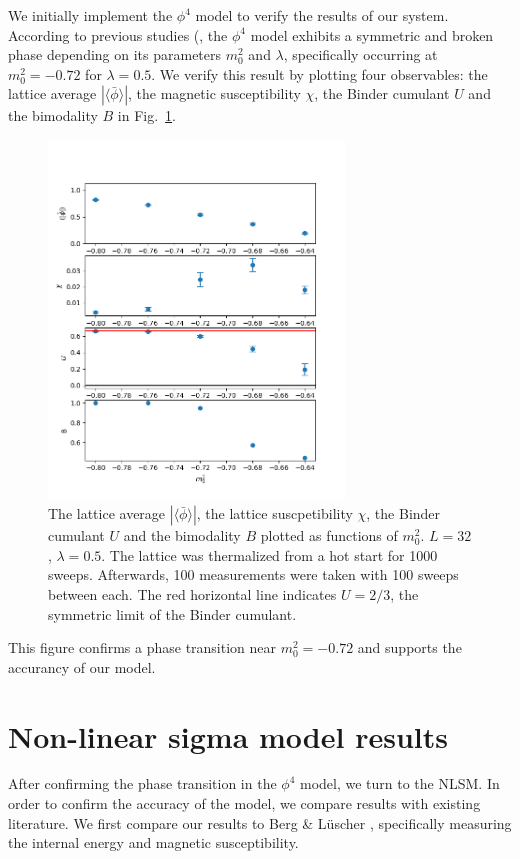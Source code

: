 \documentclass[12pt]{report}
\begin{document}
We initially implement the $\phi^4$ model to verify the results of our system. According to previous studies (\cite{monahan2016, schaich2006}, the $\phi^4$ model exhibits a symmetric and broken phase depending on its parameters $m_0^2$ and $\lambda$, specifically occurring at $m_0^2 = -0.72$ for $\lambda = 0.5$. We verify this result by plotting four observables: the lattice average $|\langle\bar\phi\rangle|$, the magnetic susceptibility $\chi$, the Binder cumulant $U$ and the bimodality $B$ in Fig.~\ref{fig:phi4}.
\begin{figure}[h]
    \centering
      \includegraphics[width=0.7\textwidth]{imgs/phi4.png}
      \caption{\label{fig:phi4} The lattice average $|\langle\bar\phi\rangle|$, the lattice suscpetibility $\chi$, the Binder cumulant $U$ and the bimodality $B$ plotted as functions of $m_0^2$. $L=32$, $\lambda=0.5$. The lattice was thermalized from a hot start for 1000 sweeps. Afterwards, 100 measurements were taken with 100 sweeps between each. The red horizontal line indicates $U=2/3$, the symmetric limit of the Binder cumulant.}
\end{figure}
This figure confirms a phase transition near $m_0^2=-0.72$ and supports the accurancy of our model.

\section{Non-linear sigma model results}
After confirming the phase transition in the $\phi^4$ model, we turn to the NLSM. In order to confirm the accuracy of the model, we compare results with existing literature. We first compare our results to Berg \& L\"uscher \cite{berg1981}, specifically measuring the internal energy and magnetic susceptibility. 
\end{document}
